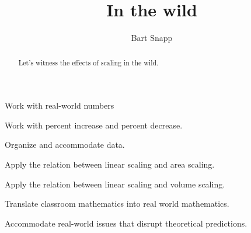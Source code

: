 \documentclass[nooutcomes,noauthor,handout]{../ximera}
\title{In the wild}
\author{Bart Snapp}
\begin{document}
\begin{abstract}
  Let's witness the effects of scaling in the wild.
\end{abstract}
\maketitle


\begin{listOutcomes}
\item Work with real-world numbers
\item Work with percent increase and percent decrease.
\item Organize and accommodate data.
\item Apply the relation between linear scaling and area scaling.
\item Apply the relation between linear scaling and volume scaling.
\item Translate classroom mathematics into real world mathematics. 
\item Accommodate real-world issues that disrupt theoretical predictions.
\end{listOutcomes}





\end{document}
